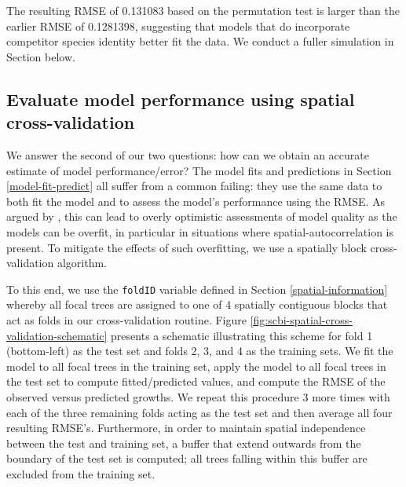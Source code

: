 \documentclass[12pt]{article}
\begin{document}
The resulting RMSE of 0.131083 based on the permutation test is larger
than the earlier RMSE of 0.1281398, suggesting that models that do
incorporate competitor species identity better fit the data. We conduct
a fuller simulation in Section below.

\hypertarget{spatial-cross-validation}{%
\subsection{Evaluate model performance using spatial
cross-validation}\label{spatial-cross-validation}}

We answer the second of our two questions: how can we obtain an accurate
estimate of model performance/error? The model fits and predictions in
Section \ref{model-fit-predict} all suffer from a common failing: they
use the same data to both fit the model and to assess the model's
performance using the RMSE. As argued by
\citet{roberts_cross-validation_2017}, this can lead to overly
optimistic assessments of model quality as the models can be overfit, in
particular in situations where spatial-autocorrelation is present. To
mitigate the effects of such overfitting, we use a spatially block
cross-validation algorithm.

To this end, we use the \texttt{foldID} variable defined in Section
\ref{spatial-information} whereby all focal trees are assigned to one of
4 spatially contiguous blocks that act as folds in our cross-validation
routine. Figure \ref{fig:scbi-spatial-cross-validation-schematic}
presents a schematic illustrating this scheme for fold 1 (bottom-left)
as the test set and folds 2, 3, and 4 as the training sets. We fit the
model to all focal trees in the training set, apply the model to all
focal trees in the test set to compute fitted/predicted values, and
compute the RMSE of the observed versus predicted growths. We repeat
this procedure 3 more times with each of the three remaining folds
acting as the test set and then average all four resulting RMSE's.
Furthermore, in order to maintain spatial independence between the test
and training set, a buffer that extend outwards from the boundary of the
test set is computed; all trees falling within this buffer are excluded
from the training set.
\end{document}
